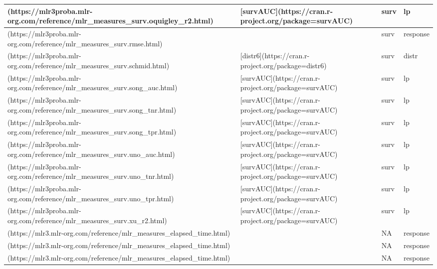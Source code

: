 \documentclass[
]{scrbook}
\begin{document}
\begin{tabular}{l|l|l|l}
\hline
[`surv.oquigley\_r2`](https://mlr3proba.mlr-org.com/reference/mlr\_measures\_surv.oquigley\_r2.html) & [survAUC](https://cran.r-project.org/package=survAUC) & surv & lp\\
\hline
[`surv.rmse`](https://mlr3proba.mlr-org.com/reference/mlr\_measures\_surv.rmse.html) &  & surv & response\\
\hline
[`surv.schmid`](https://mlr3proba.mlr-org.com/reference/mlr\_measures\_surv.schmid.html) & [distr6](https://cran.r-project.org/package=distr6) & surv & distr\\
\hline
[`surv.song\_auc`](https://mlr3proba.mlr-org.com/reference/mlr\_measures\_surv.song\_auc.html) & [survAUC](https://cran.r-project.org/package=survAUC) & surv & lp\\
\hline
[`surv.song\_tnr`](https://mlr3proba.mlr-org.com/reference/mlr\_measures\_surv.song\_tnr.html) & [survAUC](https://cran.r-project.org/package=survAUC) & surv & lp\\
\hline
[`surv.song\_tpr`](https://mlr3proba.mlr-org.com/reference/mlr\_measures\_surv.song\_tpr.html) & [survAUC](https://cran.r-project.org/package=survAUC) & surv & lp\\
\hline
[`surv.uno\_auc`](https://mlr3proba.mlr-org.com/reference/mlr\_measures\_surv.uno\_auc.html) & [survAUC](https://cran.r-project.org/package=survAUC) & surv & lp\\
\hline
[`surv.uno\_tnr`](https://mlr3proba.mlr-org.com/reference/mlr\_measures\_surv.uno\_tnr.html) & [survAUC](https://cran.r-project.org/package=survAUC) & surv & lp\\
\hline
[`surv.uno\_tpr`](https://mlr3proba.mlr-org.com/reference/mlr\_measures\_surv.uno\_tpr.html) & [survAUC](https://cran.r-project.org/package=survAUC) & surv & lp\\
\hline
[`surv.xu\_r2`](https://mlr3proba.mlr-org.com/reference/mlr\_measures\_surv.xu\_r2.html) & [survAUC](https://cran.r-project.org/package=survAUC) & surv & lp\\
\hline
[`time\_both`](https://mlr3.mlr-org.com/reference/mlr\_measures\_elapsed\_time.html) &  & NA & response\\
\hline
[`time\_predict`](https://mlr3.mlr-org.com/reference/mlr\_measures\_elapsed\_time.html) &  & NA & response\\
\hline
[`time\_train`](https://mlr3.mlr-org.com/reference/mlr\_measures\_elapsed\_time.html) &  & NA & response\\
\hline
\end{tabular}
\end{document}
